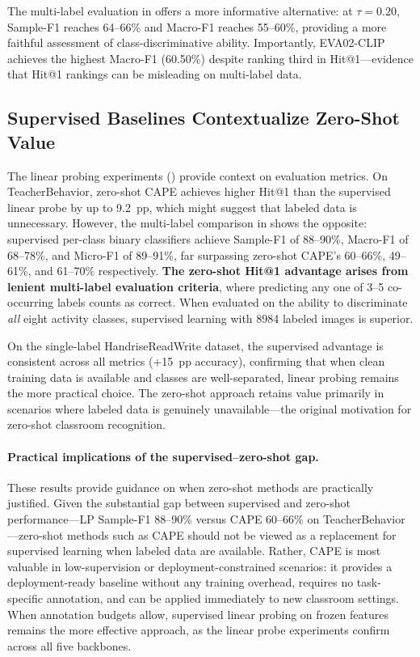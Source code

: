 \documentclass[symmetry,article,submit,pdftex,moreauthors]{Definitions/mdpi}
\begin{document}
The multi-label evaluation in  offers a more informative alternative: at $\tau=0.20$, Sample-F1 reaches 64--66\% and Macro-F1 reaches 55--60\%, providing a more faithful assessment of class-discriminative ability. Importantly, EVA02-CLIP achieves the highest Macro-F1 (60.50\%) despite ranking third in Hit@1---evidence that Hit@1 rankings can be misleading on multi-label data.

\subsection{Supervised Baselines Contextualize Zero-Shot Value}
\label{sec:discuss_linear_probe}

The linear probing experiments () provide context on evaluation metrics. On TeacherBehavior, zero-shot CAPE achieves higher Hit@1 than the supervised linear probe by up to 9.2~pp, which might suggest that labeled data is unnecessary. However, the multi-label comparison in  shows the opposite: supervised per-class binary classifiers achieve Sample-F1 of 88--90\%, Macro-F1 of 68--78\%, and Micro-F1 of 89--91\%, far surpassing zero-shot CAPE's 60--66\%, 49--61\%, and 61--70\% respectively. \textbf{The zero-shot Hit@1 advantage arises from lenient multi-label evaluation criteria}, where predicting any one of 3--5 co-occurring labels counts as correct. When evaluated on the ability to discriminate \emph{all} eight activity classes, supervised learning with 8984 labeled images is superior.

On the single-label HandriseReadWrite dataset, the supervised advantage is consistent across all metrics (+15~pp accuracy), confirming that when clean training data is available and classes are well-separated, linear probing remains the more practical choice. The zero-shot approach retains value primarily in scenarios where labeled data is genuinely unavailable---the original motivation for zero-shot classroom recognition.

\paragraph{Practical implications of the supervised--zero-shot gap.}
These results provide guidance on when zero-shot methods are practically justified. Given the substantial gap between supervised and zero-shot performance---LP Sample-F1 88--90\% versus CAPE 60--66\% on TeacherBehavior---zero-shot methods such as CAPE should not be viewed as a replacement for supervised learning when labeled data are available. Rather, CAPE is most valuable in low-supervision or deployment-constrained scenarios: it provides a deployment-ready baseline without any training overhead, requires no task-specific annotation, and can be applied immediately to new classroom settings. When annotation budgets allow, supervised linear probing on frozen features remains the more effective approach, as the linear probe experiments confirm across all five backbones.
\end{document}
